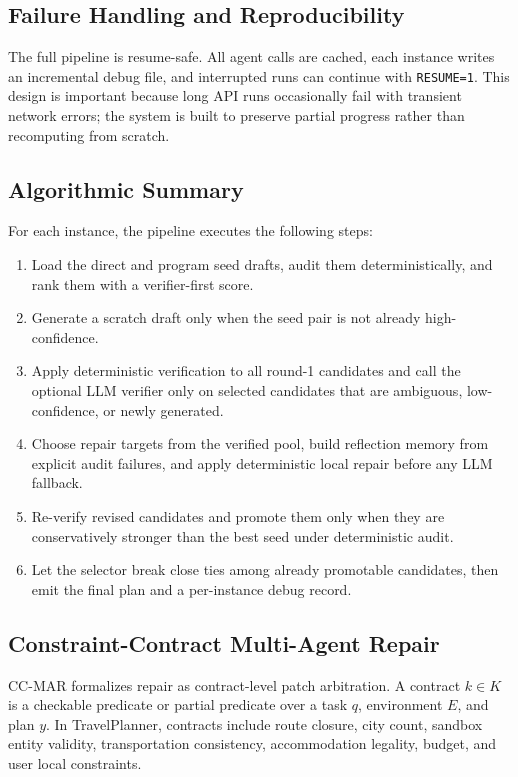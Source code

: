 \documentclass{article}
\begin{document}
\subsection{Failure Handling and Reproducibility}
The full pipeline is resume-safe. All agent calls are cached, each instance writes an incremental debug file, and interrupted runs can continue with \texttt{RESUME=1}. This design is important because long API runs occasionally fail with transient network errors; the system is built to preserve partial progress rather than recomputing from scratch.

\subsection{Algorithmic Summary}
For each instance, the pipeline executes the following steps:
\begin{enumerate}[leftmargin=1.5em]
    \item Load the direct and program seed drafts, audit them deterministically, and rank them with a verifier-first score.
    \item Generate a scratch draft only when the seed pair is not already high-confidence.
    \item Apply deterministic verification to all round-1 candidates and call the optional LLM verifier only on selected candidates that are ambiguous, low-confidence, or newly generated.
    \item Choose repair targets from the verified pool, build reflection memory from explicit audit failures, and apply deterministic local repair before any LLM fallback.
    \item Re-verify revised candidates and promote them only when they are conservatively stronger than the best seed under deterministic audit.
    \item Let the selector break close ties among already promotable candidates, then emit the final plan and a per-instance debug record.
\end{enumerate}

\subsection{Constraint-Contract Multi-Agent Repair}
CC-MAR formalizes repair as contract-level patch arbitration. A contract $k \in K$ is a checkable predicate or partial predicate over a task $q$, environment $E$, and plan $y$. In TravelPlanner, contracts include route closure, city count, sandbox entity validity, transportation consistency, accommodation legality, budget, and user local constraints.
\end{document}
